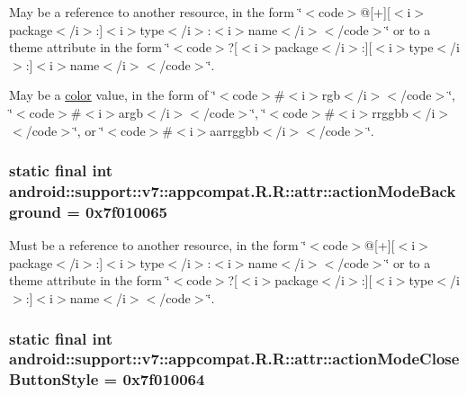 May be a reference to another resource, in the form \char`\"{}$<$code$>$@\mbox{[}+\mbox{]}\mbox{[}$<$i$>$package$<$/i$>$:\mbox{]}$<$i$>$type$<$/i$>$:$<$i$>$name$<$/i$>$$<$/code$>$\char`\"{} or to a theme attribute in the form \char`\"{}$<$code$>$?\mbox{[}$<$i$>$package$<$/i$>$:\mbox{]}\mbox{[}$<$i$>$type$<$/i$>$:\mbox{]}$<$i$>$name$<$/i$>$$<$/code$>$\char`\"{}. 

May be a \hyperlink{classandroid_1_1support_1_1v7_1_1appcompat_1_1_r_1_1color}{color} value, in the form of \char`\"{}$<$code$>$\#$<$i$>$rgb$<$/i$>$$<$/code$>$\char`\"{}, \char`\"{}$<$code$>$\#$<$i$>$argb$<$/i$>$$<$/code$>$\char`\"{}, \char`\"{}$<$code$>$\#$<$i$>$rrggbb$<$/i$>$$<$/code$>$\char`\"{}, or \char`\"{}$<$code$>$\#$<$i$>$aarrggbb$<$/i$>$$<$/code$>$\char`\"{}. \hypertarget{classandroid_1_1support_1_1v7_1_1appcompat_1_1_r_1_1attr_6dba49271acae4ec9b78050943a2b365}{
\subsubsection[{actionModeBackground}]{\setlength{\rightskip}{0pt plus 5cm}static final int android::support::v7::appcompat.R.R::attr::actionModeBackground = 0x7f010065}}
\label{classandroid_1_1support_1_1v7_1_1appcompat_1_1_r_1_1attr_6dba49271acae4ec9b78050943a2b365}


Must be a reference to another resource, in the form \char`\"{}$<$code$>$@\mbox{[}+\mbox{]}\mbox{[}$<$i$>$package$<$/i$>$:\mbox{]}$<$i$>$type$<$/i$>$:$<$i$>$name$<$/i$>$$<$/code$>$\char`\"{} or to a theme attribute in the form \char`\"{}$<$code$>$?\mbox{[}$<$i$>$package$<$/i$>$:\mbox{]}\mbox{[}$<$i$>$type$<$/i$>$:\mbox{]}$<$i$>$name$<$/i$>$$<$/code$>$\char`\"{}. \hypertarget{classandroid_1_1support_1_1v7_1_1appcompat_1_1_r_1_1attr_4da128f48e440bbaae3c6d5e4d362180}{
\subsubsection[{actionModeCloseButtonStyle}]{\setlength{\rightskip}{0pt plus 5cm}static final int android::support::v7::appcompat.R.R::attr::actionModeCloseButtonStyle = 0x7f010064}}
\label{classandroid_1_1support_1_1v7_1_1appcompat_1_1_r_1_1attr_4da128f48e440bbaae3c6d5e4d362180}


